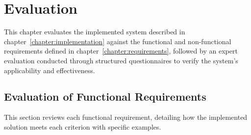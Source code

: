 \chapter{Evaluation}
\label{sec:evaluation}

This chapter evaluates the implemented system described in chapter~\ref{chapter:implementation} against the functional and non-functional requirements defined in chapter~\ref{chapter:requirements}, followed by an expert evaluation conducted through structured questionnaires to verify the system’s applicability and effectiveness.

\section{Evaluation of Functional Requirements}

This section reviews each functional requirement, detailing how the implemented solution meets each criterion with specific examples.

